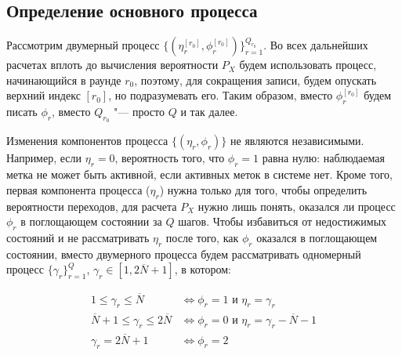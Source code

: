 \subsection{Определение основного процесса}

Рассмотрим двумерный процесс $\{ (\eta_r^{[r_0]}, \phi_r^{[r_0]}) \}_{r=1}^{Q_{r_0}}$. Во всех дальнейших расчетах вплоть до вычисления вероятности $P_X$ будем использовать процесс, начинающийся в раунде $r_0$, поэтому, для сокращения записи, будем опускать верхний индекс $[r_0]$, но подразумевать его. Таким образом, вместо $\phi_r^{[r_0]}$ будем писать $\phi_r$, вместо $Q_{r_0}$ "--- просто $Q$ и так далее.

Изменения компонентов процесса $\{ (\eta_r, \phi_r) \}$ не являются независимыми. Например, если $\eta_r = 0$, вероятность того, что $\phi_r = 1$ равна нулю: наблюдаемая метка не может быть активной, если активных меток в системе нет. Кроме того, первая компонента процесса ($\eta_r$) нужна только для того, чтобы определить вероятности переходов, для расчета $P_X$ нужно лишь понять, оказался ли процесс $\phi_r$ в поглощающем состоянии за $Q$ шагов. Чтобы избавиться от недостижимых состояний и не рассматривать $\eta_r$ после того, как $\phi_r$ оказался в поглощающем состоянии, вместо двумерного процесса будем рассматривать одномерный процесс $\{ \gamma_r \}_{r=1}^Q$, $\gamma_r \in [1, 2\overline{N}+1]$, в котором:

\begin{equation}\label{eq:ch3_gamma_process}
	\begin{aligned}
		1 \leqslant \gamma_r \leqslant \overline{N}                 &\Leftrightarrow \phi_r = 1 \text{ и } \eta_r = \gamma_r \\
		\overline{N} + 1 \leqslant \gamma_r \leqslant 2\overline{N} &\Leftrightarrow \phi_r = 0 \text{ и } \eta_r = \gamma_r - \overline{N} - 1\\
		\gamma_r = 2\overline{N}+1                                  &\Leftrightarrow \phi_r = 2
	\end{aligned}
\end{equation}

